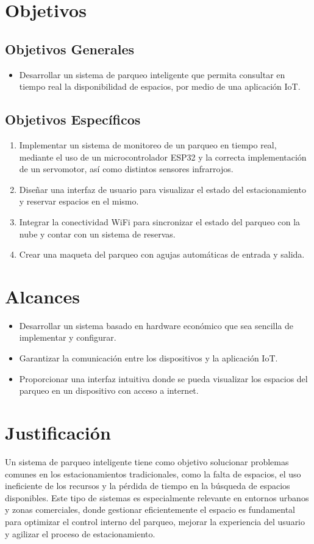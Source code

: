\documentclass[12pt,a4paper]{article}
\begin{document}
\section{Objetivos}

\subsection{Objetivos Generales}
\begin{itemize}
    \item Desarrollar un sistema de parqueo inteligente que permita consultar en tiempo real la disponibilidad de espacios, por medio de una aplicación IoT.
\end{itemize}


\subsection{Objetivos Específicos}
\begin{enumerate}
    \item Implementar un sistema de monitoreo de un parqueo en tiempo real, mediante el uso de un microcontrolador ESP32 y la correcta implementación de un servomotor, así como distintos sensores infrarrojos.
    \item Diseñar una interfaz de usuario para visualizar el estado del estacionamiento y reservar espacios en el mismo.  
    \item Integrar la conectividad WiFi para sincronizar el estado del parqueo con la nube y contar con un sistema de reservas. 
    \item Crear una maqueta del parqueo con agujas automáticas de entrada y salida.
\end{enumerate}


\section{Alcances}
\begin{itemize}
    \item Desarrollar un sistema basado en hardware económico que sea sencilla de implementar y configurar.
    \item Garantizar la comunicación entre los dispositivos y la aplicación IoT. 
    \item Proporcionar una interfaz intuitiva donde se pueda visualizar los espacios del parqueo en un dispositivo con acceso a internet.
\end{itemize}

\section{Justificación}
Un sistema de parqueo inteligente tiene como objetivo solucionar problemas comunes en los estacionamientos tradicionales, como la falta de espacios, el uso ineficiente de los recursos y la pérdida de tiempo en la búsqueda de espacios disponibles. Este tipo de sistemas es especialmente relevante en entornos urbanos y zonas comerciales, donde gestionar eficientemente el espacio es fundamental para optimizar el control interno del parqueo, mejorar la experiencia del usuario y agilizar el proceso de estacionamiento.
\end{document}
